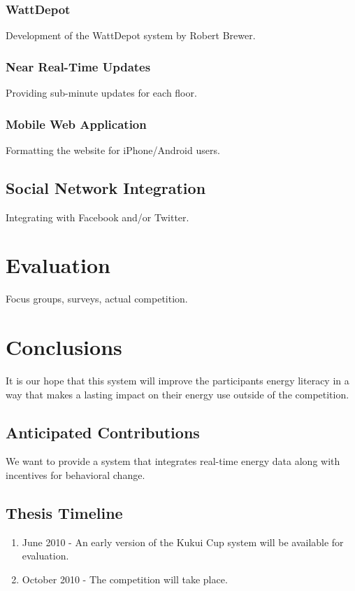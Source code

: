 \subsection{WattDepot}

Development of the WattDepot system by Robert Brewer.

\subsection{Near Real-Time Updates}

Providing sub-minute updates for each floor.

\subsection{Mobile Web Application}

Formatting the website for iPhone/Android users.

\section{Social Network Integration}
\label{socialint}

Integrating with Facebook and/or Twitter.


\chapter{Evaluation}

Focus groups, surveys, actual competition.

\chapter{Conclusions}

It is our hope that this system will improve the participants energy literacy in a way that makes a lasting impact on their energy use outside of the competition.

\section{Anticipated Contributions}

We want to provide a system that integrates real-time energy data along with incentives for behavioral change.

\section{Thesis Timeline}

\begin{enumerate}
\item June 2010 - An early version of the Kukui Cup system will be available for evaluation.
\item October 2010 - The competition will take place.
\end{enumerate}